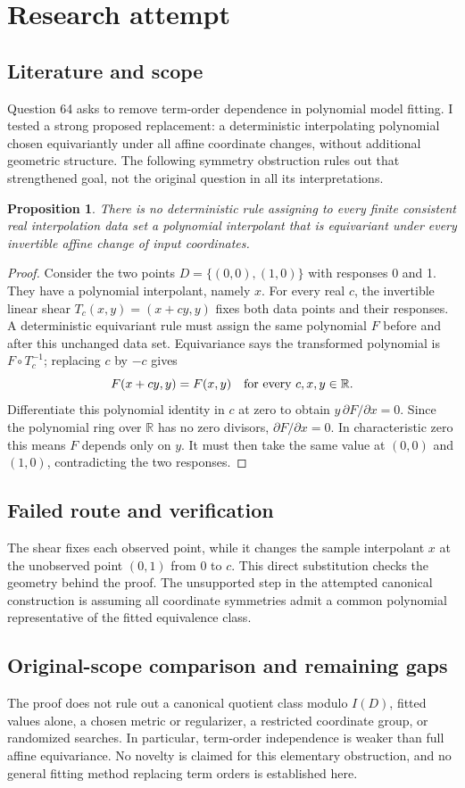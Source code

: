\documentclass[11pt]{article}
\newtheorem{proposition}{Proposition}
\begin{document}
\section{Research attempt}
\subsection{Literature and scope}
Question 64 asks to remove term-order dependence in polynomial model fitting. I tested a strong proposed replacement: a deterministic interpolating polynomial chosen equivariantly under all affine coordinate changes, without additional geometric structure. The following symmetry obstruction rules out that strengthened goal, not the original question in all its interpretations.
\begin{proposition}
There is no deterministic rule assigning to every finite consistent real interpolation data set a polynomial interpolant that is equivariant under every invertible affine change of input coordinates.
\end{proposition}
\begin{proof}
Consider the two points $D=\{(0,0),(1,0)\}$ with responses 0 and 1. They have a polynomial interpolant, namely $x$. For every real $c$, the invertible linear shear $T_c(x,y)=(x+cy,y)$ fixes both data points and their responses. A deterministic equivariant rule must assign the same polynomial $F$ before and after this unchanged data set. Equivariance says the transformed polynomial is $F\circ T_c^{-1}$; replacing $c$ by $-c$ gives
\[
F(x+cy,y)=F(x,y)\quad\hbox{for every }c,x,y\in\mathbb R.
\]
Differentiate this polynomial identity in $c$ at zero to obtain $y\,\partial F/\partial x=0$. Since the polynomial ring over $\mathbb R$ has no zero divisors, $\partial F/\partial x=0$. In characteristic zero this means $F$ depends only on $y$. It must then take the same value at $(0,0)$ and $(1,0)$, contradicting the two responses.
\end{proof}
\subsection{Failed route and verification}
The shear fixes each observed point, while it changes the sample interpolant $x$ at the unobserved point $(0,1)$ from 0 to $c$. This direct substitution checks the geometry behind the proof. The unsupported step in the attempted canonical construction is assuming all coordinate symmetries admit a common polynomial representative of the fitted equivalence class.
\subsection{Original-scope comparison and remaining gaps}
The proof does not rule out a canonical quotient class modulo $I(D)$, fitted values alone, a chosen metric or regularizer, a restricted coordinate group, or randomized searches. In particular, term-order independence is weaker than full affine equivariance. No novelty is claimed for this elementary obstruction, and no general fitting method replacing term orders is established here.
\end{document}
